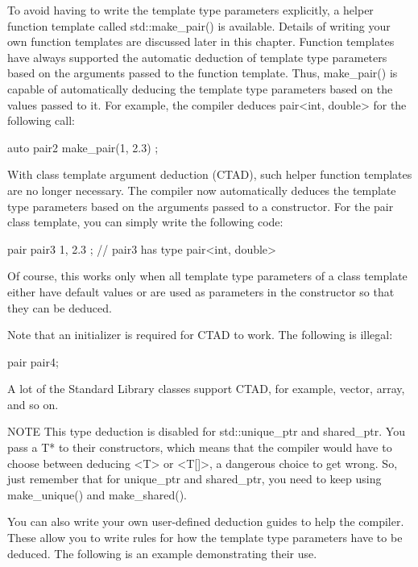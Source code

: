To avoid having to write the template type parameters explicitly, a helper function template called std::make\_pair() is available. Details of writing your own function templates are discussed later in this chapter. Function templates have always supported the automatic deduction of template type parameters based on the arguments passed to the function template. Thus, make\_pair() is capable of automatically deducing the template type parameters based on the values passed to it. For example, the compiler deduces pair<int, double> for the following call:

\begin{cpp}
auto pair2 { make_pair(1, 2.3) };
\end{cpp}

With class template argument deduction (CTAD), such helper function templates are no longer necessary. The compiler now automatically deduces the template type parameters based on the arguments passed to a constructor. For the pair class template, you can simply write the following code:

\begin{cpp}
pair pair3 { 1, 2.3 }; // pair3 has type pair<int, double>
\end{cpp}

Of course, this works only when all template type parameters of a class template either have default values or are used as parameters in the constructor so that they can be deduced.

Note that an initializer is required for CTAD to work. The following is illegal:

\begin{cpp}
pair pair4;
\end{cpp}

A lot of the Standard Library classes support CTAD, for example, vector, array, and so on.

\begin{myNotic}{NOTE}
This type deduction is disabled for std::unique\_ptr and shared\_ptr. You pass a T* to their constructors, which means that the compiler would have to choose between deducing <T> or <T[]>, a dangerous choice to get wrong. So, just remember that for unique\_ptr and shared\_ptr, you need to keep using make\_unique() and make\_shared().
\end{myNotic}


You can also write your own user-defined deduction guides to help the compiler. These allow you to write rules for how the template type parameters have to be deduced. The following is an example demonstrating their use.

